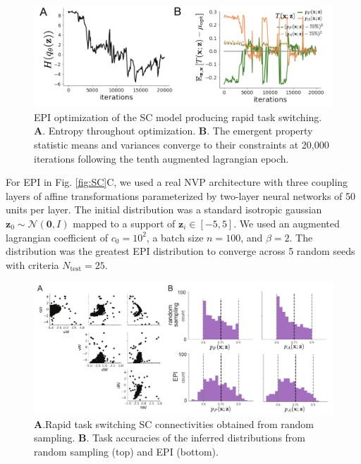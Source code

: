 \documentclass[11pt]{article}
\begin{document}
\begin{figure}
\begin{center}
\includegraphics[scale=0.5]{figures/figSC7/figSC7.pdf}
\end{center}
\caption{EPI optimization of the SC model producing rapid task switching.
\textbf{A}. Entropy throughout optimization. 
\textbf{B}. The emergent property statistic means and variances converge to their constraints at 20,000 iterations following the tenth augmented lagrangian epoch.
}
\label{fig:SC7}
\end{figure}

For EPI in Fig. \ref{fig:SC}C, we used a real NVP architecture with three coupling layers of affine transformations parameterized by two-layer neural networks of 50 units per layer.
The initial distribution was a standard isotropic gaussian $\mathbf{z}_0 \sim \mathcal{N}(\mathbf{0}, I)$ mapped to a support of $\mathbf{z}_i \in [-5, 5]$. 
We used an augmented lagrangian coefficient of $c_0 = 10^{2}$, a batch size $n=100$, and $\beta=2$.
The distribution was the greatest EPI distribution to converge across 5 random seeds with criteria $N_{\text{test}} = 25$.

\begin{figure}
\begin{center}
\includegraphics[scale=0.8]{figures/figSC8/figSC8.pdf}
\end{center}
\caption{
\textbf{A}.Rapid task switching SC connectivities obtained from random sampling.
\textbf{B}. Task accuracies of the inferred distributions from random sampling (top) and EPI (bottom).
}
\label{fig:SC8}
\end{figure}
\end{document}
